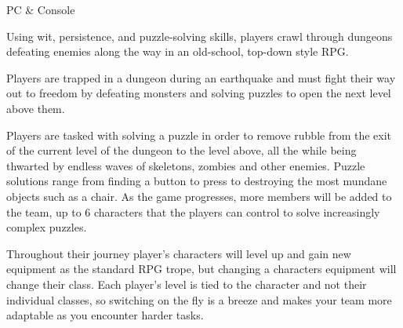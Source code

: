 \documentclass[archE1,portrait]{baposter}
\begin{document}
\begin{poster}
{ 
	PC \& Console
}


{
	\quad Using wit, persistence, and puzzle-solving skills, players crawl through dungeons defeating enemies along the way in an old-school, top-down style RPG.
}


{
	\quad Players are trapped in a dungeon during an earthquake and must fight their way out to freedom by defeating monsters and solving puzzles to open the next level above them.
}


{
	\quad Players are tasked with solving a puzzle in order to remove rubble from the exit of the current level of the dungeon to the level above, all the while being thwarted by endless waves of skeletons, zombies and other enemies. Puzzle solutions range from finding a button to press to destroying the most mundane objects such as a chair. As the game progresses, more members will be added to the team, up to 6 characters that the players can control to solve increasingly complex puzzles.
	
	\quad Throughout their journey player's characters will level up and gain new equipment as the standard RPG trope, but changing a characters equipment will change their class. Each player's level is tied to the character and not their individual classes, so switching on the fly is a breeze and makes your team more adaptable as you encounter harder tasks.
	
}
\end{poster}
\end{document}
